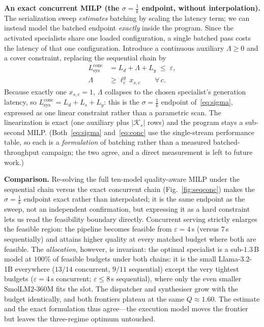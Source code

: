 \documentclass[11pt]{article}
\newcommand{\eps}{\varepsilon}
\begin{document}
\textbf{An exact concurrent MILP (the $\sigma{=}\tfrac1k$ endpoint, without
interpolation).} The serialization sweep \emph{estimates} batching by scaling the
latency term; we can instead model the batched endpoint \emph{exactly} inside the
program. Since the activated specialists share one loaded configuration, a single
batched pass costs the latency of that one configuration. Introduce a continuous
auxiliary $\Lambda\ge0$ and a cover constraint, replacing the sequential chain by
\begin{align}
L_{\mathrm{sys}}^{\mathrm{conc}} &= L_d + \Lambda + L_y \;\le\; \eps,
\label{eq:conc}\\
\Lambda &\ge \ell^{g}_{c}\,x_{s,c} \qquad \forall\,c .
\label{eq:conc-cover}
\end{align}
Because exactly one $x_{s,c}{=}1$, $\Lambda$ collapses to the chosen specialist's
generation latency, so $L^{\mathrm{conc}}_{\mathrm{sys}}=L_d+L_s+L_y$: this is the
$\sigma{=}\tfrac1k$ endpoint of~\eqref{eq:sigma}, expressed as one linear constraint
rather than a parametric scan. The linearization is exact (one auxiliary plus
$|\mathcal{K}_s|$ rows) and the program stays a sub-second MILP. (Both~\eqref{eq:sigma}
and~\eqref{eq:conc} use the single-stream performance table, so each is a
\emph{formulation} of batching rather than a measured batched-throughput campaign;
the two agree, and a direct measurement is left to future work.)

\textbf{Comparison.} Re-solving the full ten-model quality-aware MILP under the
sequential chain versus the exact concurrent chain (Fig.~\ref{fig:seqconc}) makes
the $\sigma{=}\tfrac1k$ endpoint exact rather than interpolated; it is the same
endpoint as the sweep, not an independent confirmation, but expressing it as a hard
constraint lets us read the feasibility boundary directly. Concurrent serving strictly enlarges the feasible
region: the pipeline becomes feasible from $\eps{=}4$\,s (versus $7$\,s
sequentially) and attains higher quality at every matched budget where both are
feasible. The \emph{allocation}, however, is invariant: the optimal specialist is
a sub-$1.3$\,B model at $100\%$ of feasible budgets under both chains: it is the
small Llama-3.2-1B everywhere ($13/14$ concurrent, $9/11$ sequential) except the
very tightest budgets ($\eps{=}4$\,s concurrent; $\eps{\le}8$\,s sequential), where
only the even smaller SmolLM2-360M fits the slot. The dispatcher and synthesiser grow with the
budget identically, and both frontiers plateau at the same $Q\approx1.60$. The
estimate and the exact formulation thus agree---the execution model moves the
frontier but leaves the three-regime optimum untouched.
\end{document}
